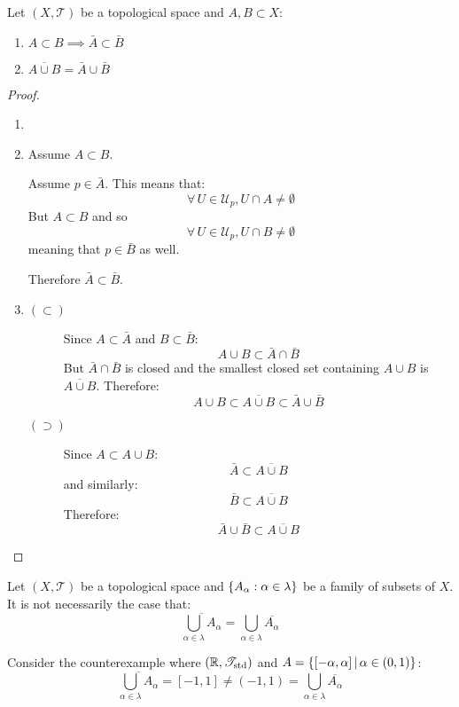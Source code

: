 \documentclass[letterpaper,12pt,fleqn]{article}
\newcommand{\T}{\mathscr{T}}
\newcommand{\U}{\mathcal{U}}
\renewcommand{\a}{\alpha}
\renewcommand{\l}{\lambda}
\begin{document}
\begin{theorem}
  Let \((X,\T)\) be a topological space and \(A,B\subset X\):
  \begin{enumerate}
  \item \(A\subset B\implies \bar{A}\subset\bar{B}\)
  \item \(\overline{A\cup B}=\bar{A}\cup\bar{B}\)
  \end{enumerate}
\end{theorem}

\begin{proof}
  \begin{enumerate}
  \item[]
  \item Assume \(A\subset B\).

    Assume \(p\in\bar{A}\).  This means that:
    \[\forall\,U\in\U_p,U\cap A\ne\emptyset\]
    But \(A\subset B\) and so
    \[\forall\,U\in\U_p,U\cap B\ne\emptyset\]
    meaning that \(p\in\bar{B}\) as well.

    Therefore \(\bar{A}\subset\bar{B}\).

  \item
    \begin{description}
    \item[\((\subset)\)] Since \(A\subset\bar{A}\) and \(B\subset\bar{B}\):
      \[A\cup B\subset\bar{A}\cap\bar{B}\]
      But \(\bar{A}\cap\bar{B}\) is closed and the smallest closed set containing \(A\cup B\) is
      \(\overline{A\cup B}\).  Therefore:
      \[A\cup B\subset\overline{A\cup B}\subset\bar{A}\cup\bar{B}\]
    \item[\((\supset)\)] Since \(A\subset A\cup B\):
      \[\bar{A}\subset\overline{A\cup B}\]
      and similarly:
      \[\bar{B}\subset\overline{A\cup B}\]
      Therefore:
      \[\bar{A}\cup\bar{B}\subset\overline{A\cup B}\]
    \end{description}
  \end{enumerate}
\end{proof}

\begin{example}
  Let \((X,\T)\) be a topological space and \(\set{A_{\a}:\a\in\l}\) be a family of subsets of \(X\).  It is not
  necessarily the case that:
  \[\overline{\bigcup_{\a\in\l}A_{\a}}=\bigcup_{\a\in\l}\overline{A_{\a}}\]

  Consider the counterexample where \((\R,\T_{\text{std}})\) and \(A=\setb{[-\a,\a]}{\a\in(0,1)}\):
  \[\overline{\bigcup_{\a\in\l}A_{\a}}=[-1,1]\ne(-1,1)=\bigcup_{\a\in\l}\overline{A_{\a}}\]
\end{example}
\end{document}
